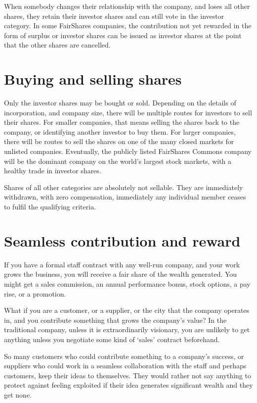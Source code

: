 When somebody changes their relationship with the company, and loses all other shares, they retain their investor shares and can still vote in the investor category. In some FairShares companies, the contribution not yet rewarded in the form of surplus or investor shares can be issued as investor shares at the point that the other shares are cancelled.


\section{Buying and selling shares}
Only the investor shares may be bought or sold. Depending on the details of incorporation, and company size, there will be multiple routes for investors to sell their shares. For smaller companies, that means selling the shares back to the company, or identifying another investor to buy them. For larger companies, there will be routes to sell the shares on one of the many closed markets for unlisted companies. Eventually, the publicly listed FairShares Commons company will be the dominant company on the world's largest stock markets, with a healthy trade in investor shares.


Shares of all other categories are absolutely not sellable. They are immediately withdrawn, with zero compensation, immediately any individual member ceases to fulfil the qualifying criteria.






\section{Seamless contribution and reward}
If you have a formal staff contract with any well-run company, and your work grows the business, you will receive a fair share of the wealth generated. You might get a sales commission, an annual performance bonus, stock options, a pay rise, or a promotion.


What if you are a customer, or a supplier, or the city that the company operates in, and you contribute something that grows the company’s value? In the traditional company, unless it is extraordinarily visionary, you are unlikely to get anything unless you negotiate some kind of ‘sales’ contract beforehand.


So many customers who could contribute something to a company’s success, or suppliers who could work in a seamless collaboration with the staff and perhaps customers, keep their ideas to themselves. They would rather not say anything to protect against feeling exploited if their idea generates significant wealth and they get none.


